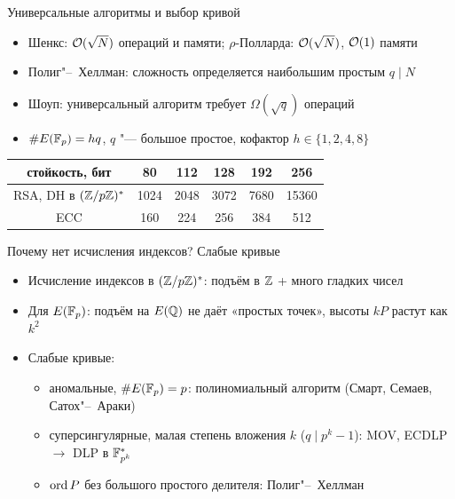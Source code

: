 \documentclass{ca-slides}
\begin{document}
\begin{canvasframe}{Универсальные алгоритмы и выбор кривой}
  \begin{itemize}
    \item Шенкс: $\mathcal{O}(\sqrt N)$ операций и памяти; $\rho$-Полларда: $\mathcal{O}(\sqrt N)$, $\mathcal{O}(1)$ памяти
    \item Полиг"--~Хеллман: сложность определяется наибольшим простым $q \mid N$
    \item Шоуп: универсальный алгоритм требует $\Omega(\sqrt q)$ операций
    \item[$\Rightarrow$] $\#E(\mathbb{F}_p) = hq$, $q$ "--- большое простое, кофактор $h \in \{1, 2, 4, 8\}$
  \end{itemize}
  \begin{center}\small
  \begin{tabular}{c|ccccc}
    стойкость, бит & 80 & 112 & 128 & 192 & 256 \\ \hline
    RSA, DH в $(\mathbb{Z}/p\mathbb{Z})^{*}$ & 1024 & 2048 & 3072 & 7680 & 15360 \\
    ECC & 160 & 224 & 256 & 384 & 512
  \end{tabular}
  \end{center}
\end{canvasframe}

\begin{canvasframe}{Почему нет исчисления индексов? Слабые кривые}
  \begin{itemize}
    \item Исчисление индексов в $(\mathbb{Z}/p\mathbb{Z})^{*}$: подъём в $\mathbb{Z}$ + много гладких чисел
    \item Для $E(\mathbb{F}_p)$: подъём на $E(\mathbb{Q})$ не даёт «простых точек», высоты $kP$ растут как $k^2$
    \item Слабые кривые:
    \begin{itemize}
      \item аномальные, $\#E(\mathbb{F}_p) = p$: полиномиальный алгоритм (Смарт, Семаев, Сатох"--~Араки)
      \item суперсингулярные, малая степень вложения $k$ ($q \mid p^k - 1$): MOV,
        ECDLP $\to$ DLP в $\mathbb{F}_{p^k}^*$
      \item $\operatorname{ord} P$ без большого простого делителя: Полиг"--~Хеллман
    \end{itemize}
  \end{itemize}
\end{canvasframe}
\end{document}
